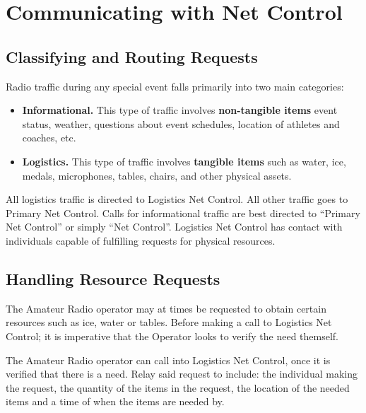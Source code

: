 \documentclass[pdflatex,letterpaper,twoside,12pt]{book}
\begin{document}

\section{Communicating with Net Control}

\subsection{Classifying and Routing Requests}

Radio traffic during any special event falls primarily into two main categories:

\begin{itemize}
	\item \textbf{Informational.}  This type of traffic involves \textbf{non-tangible items} event status, weather, questions about event schedules, location of athletes and coaches, etc.
	\item \textbf{Logistics.}  This type of traffic involves \textbf{tangible items} such as water, ice, medals, microphones, tables, chairs, and other physical assets.
\end{itemize}

All logistics traffic is directed to Logistics Net Control.  All other traffic goes to Primary Net Control.  Calls for informational traffic are best directed to ``Primary Net Control'' or simply ``Net Control''.  Logistics Net Control has contact with individuals capable of fulfilling requests for physical resources.


\subsection{Handling Resource Requests}

The Amateur Radio operator may at times be requested to obtain certain resources such as ice, water or tables.  Before making a call to Logistics Net Control; it is imperative that the Operator looks to verify the need themself.

The Amateur Radio operator can call into Logistics Net Control, once it is verified that there is a need.  Relay said request to include: the individual making the request, the quantity of the items in the request, the location of the needed items and a time of when the items are needed by.
\end{document}
